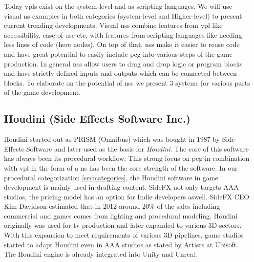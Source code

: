 \documentclass[10pt,a4paper]{article}
\begin{document}
\begin{multicols}{2}
Today \gls{vpl}s exist on the system-level and as scripting languages. We will use visual \gls{ns} examples in both categories (system-level and Higher-level) to present current trending developments. Visual \gls{ns}s combine features from \gls{vpl} like accessibility, ease-of-use etc. with features from scripting languages like needing less lines of code (here nodes). On top of that, \gls{ns}s make it easier to reuse code and have great potential to easily include \gls{pcg} into various steps of the game production. In general \gls{ns}s allow users to drag and drop logic or program blocks and have strictly defined inputs and outputs which can be connected between blocks. To elaborate on the potential of \gls{ns}s we present 3 systems for various parts of the game development. 

\subsection{Houdini (Side Effects Software Inc.)}
Houdini started out as PRISM (Omnibus) which was bought in 1987 by Side Effects Software and later used as the basis for \textit{Houdini}. The core of this software has always been its procedural workflow. This strong focus on \gls{pcg} in combination with \gls{vpl} in the form of a \gls{ns} has been the core strength of the software\cite{Seymour2012}. In our procedural categorization \autoref{sec:categories}, the Houdini software in game development is mainly used in drafting content. SideFX not only targets AAA studios, the pricing model has an option for Indie developers aswell. SideFX CEO Kim Davidson estimated that in 2012 around 20\% of the sales including commercial and games comes from lighting and procedural modeling. Houdini originally was used for tv production and later expanded to various 3D sectors. With this expansion to meet requirements of various 3D pipelines, game studios started to adapt Houdini even in AAA studios as stated by Artists at Ubisoft\cite{Carrier2018}. The Houdini engine is already integrated into Unity and Unreal\cite{SideFXGamesupport}.

\end{multicols}
\end{document}
